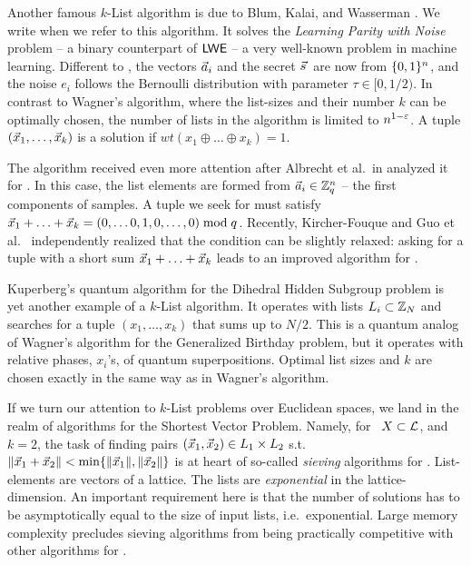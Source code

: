 Another famous $k$-List algorithm is due to Blum, Kalai, and Wasserman \cite{BKW}. We write \BKW when we refer to this algorithm. It solves the \emph{Learning Parity with Noise} problem -- a binary counterpart of $\textsf{LWE}$ -- a very well-known problem in machine learning. Different to \LWE, the vectors $\vec a_i$ and the secret $\svec$ are now from $\{0,1 \}^{n}$, and the noise $e_i$ follows the Bernoulli distribution with parameter $\tau \in [0, 1/2)$. In contrast to Wagner's algorithm, where the list-sizes and their number $k$ can be optimally chosen, the number of lists in the \BKW algorithm is limited to $n^{1-\varepsilon}$. A tuple $(\vec x_1, \ldots, \vec x_k)$ is a solution if $wt(x_1 \oplus \ldots \oplus x_k) = 1$. 

The \BKW algorithm received even more attention after Albrecht et al.\ in \cite{DCC:ACFFP15} analyzed it for \LWE. In this case, the list elements are formed from $\vec a_i \in {{\mathbb Z}}_q^n$ -- the first components of \LWE samples. A tuple we seek for must satisfy $\vec x_1 + \ldots + \vec x_k =  (0, \ldots 0, 1, 0, \ldots, 0) \bmod q$. Recently, Kircher-Fouque \cite{C:KirFou15} and Guo et al.\ \cite{C:GuoJohSta15} independently realized that the condition can be slightly relaxed: asking for a tuple with a short sum $\vec x_1 + \ldots + \vec x_k$ leads to an improved algorithm for \LWE. %

Kuperberg's quantum algorithm for the Dihedral Hidden Subgroup problem \cite{Kup05} is yet another example of a $k$-List algorithm. It operates with lists $L_i \subset {{\mathbb Z}}_N$ and searches for a tuple $(x_1, \ldots, x_k)$ that sums up to $N/2$. This is a quantum analog of Wagner's algorithm for the Generalized Birthday problem, but it operates with relative phases, $x_i$'s, of quantum superpositions. Optimal list sizes and $k$ are chosen exactly in the same way as in Wagner's algorithm. 

If we turn our attention to $k$-List problems over Euclidean spaces, we land in the realm of algorithms for the Shortest Vector Problem. Namely, for \ $X \subset \mathcal{L}$, and $k=2$, the task of finding pairs $(\vec x_1, \vec x_2) \in L_1 \times L_2$ s.t.\ $\| \vec x_1 + \vec x_2 \| < \min \{ \| \vec x_1 \|, \| \vec x_2 \| \}$ is at heart of so-called \emph{sieving} algorithms for \SVP \cite{STOC:AjtKumSiv01}. List-elements are vectors of a lattice. The lists are \emph{exponential} in the lattice-dimension. An important requirement here is that the number of solutions has to be asymptotically equal to the size of input lists, i.e.\ exponential. 
Large memory complexity precludes sieving algorithms from being practically competitive with other algorithms for \SVP.

